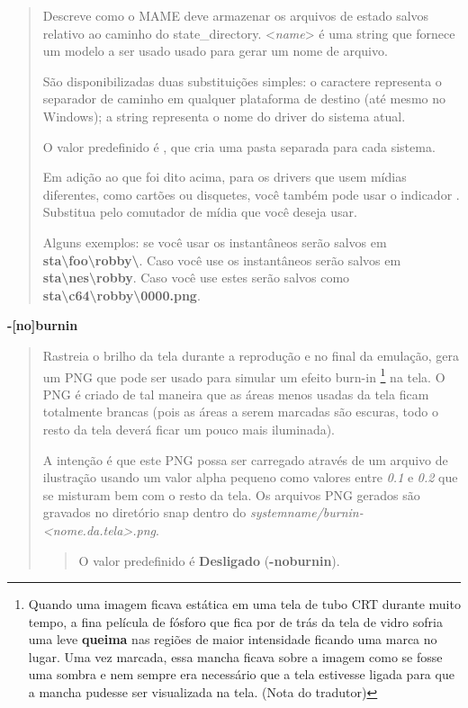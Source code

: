 \documentclass[letterpaper,10pt,brazil]{sphinxmanual}
\begin{document}
\begin{quote}

Descreve como o MAME deve armazenar os arquivos de estado salvos
relativo ao caminho do state\_directory. \textless{}\emph{name}\textgreater{} é uma string que
fornece um modelo a ser usado usado para gerar um nome de arquivo.

São disponibilizadas duas substituições simples: o caractere \sphinxcode{/}
representa o separador de caminho em qualquer plataforma de destino
(até mesmo no Windows); a string  representa o nome do driver
do sistema atual.

O valor predefinido é , que cria uma pasta separada para cada
sistema.

Em adição ao que foi dito acima, para os drivers que usem mídias
diferentes, como cartões ou disquetes, você também pode usar o
indicador . Substitua \sphinxcode{{[}media{]}} pelo comutador de
mídia que você deseja usar.

Alguns exemplos: se você usar  os
instantâneos serão salvos em \textbf{sta\textbackslash{}foo\textbackslash{}robby\textbackslash{}}. Caso você use
 os instantâneos serão
salvos em \textbf{sta\textbackslash{}nes\textbackslash{}robby}. Caso você use
 estes serão
salvos como \textbf{sta\textbackslash{}c64\textbackslash{}robby\textbackslash{}0000.png}.
\end{quote}
\label{commandline/commandline-all:mame-commandline-noburnin}
\textbf{-{[}no{]}burnin}
\begin{quote}

Rastreia o brilho da tela durante a reprodução e no final da
emulação, gera um PNG que pode ser usado para simular um efeito
burn-in \footnote[4]{\sphinxAtStartFootnote%
Quando uma imagem ficava estática em uma tela de tubo CRT
durante muito tempo, a fina película de fósforo que fica por de
trás da tela de vidro sofria uma leve \textbf{queima} nas regiões de
maior intensidade ficando uma marca no lugar. Uma vez marcada,
essa mancha ficava sobre a imagem como se fosse uma sombra e nem
sempre era necessário que a tela estivesse ligada para que a
mancha pudesse ser visualizada na tela. (Nota do tradutor)
} na tela. O PNG é criado de tal maneira que as
áreas menos usadas da tela ficam totalmente brancas (pois as áreas a
serem marcadas são escuras, todo o resto da tela deverá ficar um
pouco mais iluminada).

A intenção é que este PNG possa ser carregado através de um arquivo
de ilustração usando um valor alpha pequeno como valores entre \emph{0.1}
e \emph{0.2} que se misturam bem com o resto da tela.
Os arquivos PNG gerados são gravados no diretório snap dentro do
\emph{systemname/burnin-\textless{}nome.da.tela\textgreater{}.png}.
\begin{quote}

O valor predefinido é \textbf{Desligado} (\textbf{-noburnin}).
\end{quote}
\end{quote}
\end{document}
